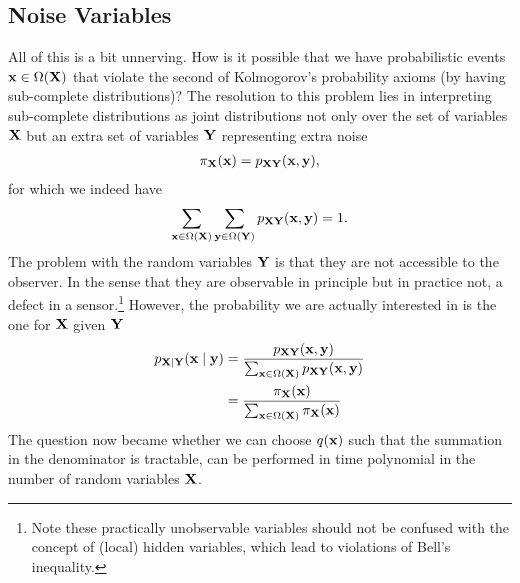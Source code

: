 \subsection{Noise Variables}


All of this is a bit unnerving. How is it possible that we have probabilistic events $\mathbf{x}\in \Omega(\mathbf{X})$ that violate the second of Kolmogorov's probability axioms (by having sub-complete distributions)? The resolution to this problem lies in interpreting sub-complete distributions as joint distributions not only over the set of variables $\mathbf{X}$ but an extra set of variables $\mathbf{Y}$ representing extra noise~\citep{wiseman2009quantum}
\begin{align}
	\pi_{\mathbf{X}}(\mathbf{x}) = p_{\mathbf{X} \mathbf{Y}}(\mathbf{x}, \mathbf{y}),
\end{align}
for which we indeed have
\begin{align}
	\sum_{\mathbf{x}\in \Omega(\mathbf{X})} \sum_{\mathbf{y}\in \Omega(\mathbf{Y})}  p_{\mathbf{X} \mathbf{Y}}(\mathbf{x}, \mathbf{y}) =1.
\end{align}
The problem with the random variables $\mathbf{Y}$ is that they are not accessible to the observer. In the sense that they are observable in principle but in practice not, \eg a defect in a sensor.\footnote{Note these practically unobservable variables should not be confused with the concept of (local) hidden variables, which lead to violations of Bell's inequality.}
However, the probability we are actually interested in is the one for $\mathbf{X}$ given $\mathbf{Y}$
\begin{align}
	p_{\mathbf{X}|\mathbf{Y}}(\mathbf{x}\mid \mathbf{y} )
	 & =
	\frac{
	p_{\mathbf{X} \mathbf{Y}}(\mathbf{x},  \mathbf{y} )
	}
	{
	\sum_{\mathbf{x}\in \Omega(\mathbf{X})}p_{\mathbf{X} \mathbf{Y}}(\mathbf{x}, \mathbf{y} )
	}
	\nonumber
	\\
	 & = \frac{\pi_{\mathbf{X}}(\mathbf{x})}{\sum_{\mathbf{x}\in \Omega(\mathbf{X})}  \pi_{\mathbf{X}}(\mathbf{x})}
\end{align}
The question now became whether we can choose $q(\mathbf{x})$ such that the summation in the denominator is tractable, \ie can be performed in time polynomial in the number of random variables $\mathbf{X}$.


